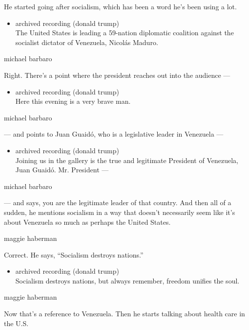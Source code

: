He started going after socialism, which has been a word he's been using
a lot.

\begin{itemize}
\tightlist
\item
  archived recording (donald trump)\\
  The United States is leading a 59-nation diplomatic coalition against
  the socialist dictator of Venezuela, Nicolás Maduro.
\end{itemize}

michael barbaro

Right. There's a point where the president reaches out into the audience
---

\begin{itemize}
\tightlist
\item
  archived recording (donald trump)\\
  Here this evening is a very brave man.
\end{itemize}

michael barbaro

--- and points to Juan Guaidó, who is a legislative leader in Venezuela
---

\begin{itemize}
\tightlist
\item
  archived recording (donald trump)\\
  Joining us in the gallery is the true and legitimate President of
  Venezuela, Juan Guaidó. Mr. President ---
\end{itemize}

michael barbaro

--- and says, you are the legitimate leader of that country. And then
all of a sudden, he mentions socialism in a way that doesn't necessarily
seem like it's about Venezuela so much as perhaps the United States.

maggie haberman

Correct. He says, ``Socialism destroys nations.''

\begin{itemize}
\tightlist
\item
  archived recording (donald trump)\\
  Socialism destroys nations, but always remember, freedom unifies the
  soul.
\end{itemize}

maggie haberman

Now that's a reference to Venezuela. Then he starts talking about health
care in the U.S.

